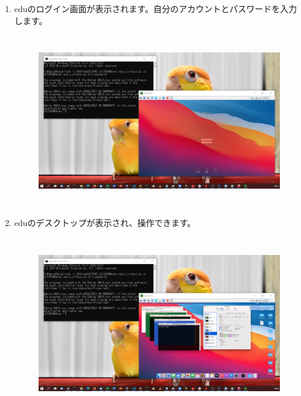 \documentclass{jarticle}
\begin{document}
\begin{enumerate}
\begin{figure}[H]
  \end{figure}
  \item eduのログイン画面が表示されます。自分のアカウントとパスワードを入力します。
  \begin{figure}[H]
    \centering
    \includegraphics[height=7.5cm,pagebox=cropbox,clip]{fig/VNCWin4.png}
  \end{figure}
  \item eduのデスクトップが表示され、操作できます。
  \begin{figure}[H]
    \centering
    \includegraphics[height=7.5cm,pagebox=cropbox,clip]{fig/VNCWin5.png}
  \end{figure}
\end{enumerate}
\end{document}
